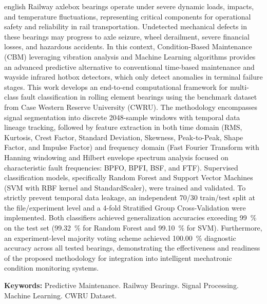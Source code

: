 \begin{resumo}[Abstract]
\begin{otherlanguage*}{english}
Railway axlebox bearings operate under severe dynamic loads, impacts, and temperature fluctuations, representing critical components for operational safety and reliability in rail transportation. Undetected mechanical defects in these bearings may progress to axle seizure, wheel derailment, severe financial losses, and hazardous accidents. In this context, Condition-Based Maintenance (CBM) leveraging vibration analysis and Machine Learning algorithms provides an advanced predictive alternative to conventional time-based maintenance and wayside infrared hotbox detectors, which only detect anomalies in terminal failure stages. This work develops an end-to-end computational framework for multi-class fault classification in rolling element bearings using the benchmark dataset from Case Western Reserve University (CWRU). The methodology encompasses signal segmentation into discrete \num{2048}-sample windows with temporal data lineage tracking, followed by feature extraction in both time domain (RMS, Kurtosis, Crest Factor, Standard Deviation, Skewness, Peak-to-Peak, Shape Factor, and Impulse Factor) and frequency domain (Fast Fourier Transform with Hanning windowing and Hilbert envelope spectrum analysis focused on characteristic fault frequencies: BPFO, BPFI, BSF, and FTF). Supervised classification models, specifically Random Forest and Support Vector Machines (SVM with RBF kernel and StandardScaler), were trained and validated. To strictly prevent temporal data leakage, an independent 70/30 train/test split at the file/experiment level and a 4-fold Stratified Group Cross-Validation were implemented. Both classifiers achieved generalization accuracies exceeding \SI{99}{\percent} on the test set (\SI{99.32}{\percent} for Random Forest and \SI{99.10}{\percent} for SVM). Furthermore, an experiment-level majority voting scheme achieved \SI{100.00}{\percent} diagnostic accuracy across all tested bearings, demonstrating the effectiveness and readiness of the proposed methodology for integration into intelligent mechatronic condition monitoring systems.

\vspace{\onelineskip}
\noindent
\textbf{Keywords:} Predictive Maintenance. Railway Bearings. Signal Processing. Machine Learning. CWRU Dataset.
\end{otherlanguage*}
\end{resumo}
